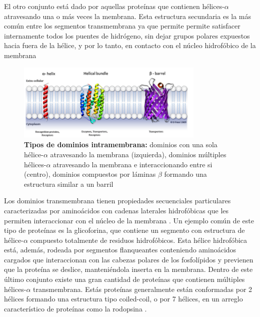 El otro conjunto está dado por aquellas proteínas que contienen hélices-$\alpha$ atravesando una o más veces la membrana. 
Esta estructura secundaria es la más común entre los segmentos transmembrana ya que permite permite satisfacer internamente todos los puentes de hidrógeno, 
sin dejar grupos polares expuestos hacia fuera de la hélice, y por lo tanto, en contacto con el núcleo hidrofóbico de la membrana


\begin{figure}[h]
\centering
\includegraphics[width=0.8\textwidth]{img/proteinasMembrana.png} 
\caption{\textbf{Tipos de dominios intramembrana:} dominios con una sola hélice-$\alpha$ atravesando la membrana (izquierda), dominios múltiples hélices-$\alpha$ atravesando la membrana e interaccionando entre si (centro), 
dominios compuestos por láminas $\beta$ formando una estructura similar a un barril} 
\label{proteinasMembrana}
\end{figure}



Los dominios transmembrana tienen propiedades secuenciales particulares caracterizadas por aminoácidos con cadenas laterales hidrofóbicas que les permiten interaccionar con el núcleo de la membrana \cite{nakashima1992amino}.
Un ejemplo común de este tipo de proteínas es la glicoforina, que contiene un segmento con estructura de hélice-$\alpha$ compuesto totalmente de residuos hidrofóbicos. 
Esta hélice hidrofóbica está, además, rodeada por segmentos flanqueantes conteniendo aminoácidos cargados que interaccionan con las cabezas polares de los fosfolípidos y previenen que la proteína se deslice,
manteniéndola inserta en la membrana.
Dentro de este último conjunto existe una gran cantidad de proteínas que contienen múltiples hélices-$\alpha$ transmembrana. Estás proteínas generalmente están conformadas por 2 hélices formando una estructura tipo coiled-coil,
o por 7 hélices, en un arreglo característico de proteínas como la rodopsina \cite{paul1985folding}.

